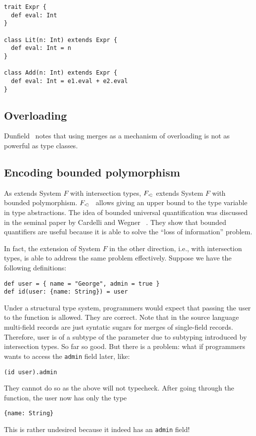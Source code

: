 
\begin{verbatim}
trait Expr {
  def eval: Int
}

class Lit(n: Int) extends Expr {
  def eval: Int = n
}

class Add(n: Int) extends Expr {
  def eval: Int = e1.eval + e2.eval
}
\end{verbatim}

\subsection{Overloading}

Dunfield~\cite{dunfield2014elaborating} notes that using merges as a mechanism
of overloading is not as powerful as type classes.

\subsection{Encoding bounded polymorphism}

As \name extends System $ F $ with intersection types, $ F_{<\!:} $ extends
System $ F $ with bounded polymorphism. $ F_{<\!:} $~\cite{pierce2002types}
allows giving an upper bound to the type variable in type abstractions. The idea
of bounded universal quantification was discussed in the seminal paper by
Cardelli and Wegner ~\cite{cardelli1985understanding}. They show that bounded
quantifiers are useful because it is able to solve the ``loss of information''
problem.

In fact, the extension of System $ F $ in the other direction, i.e., with
intersection types, is able to address the same problem effectively. Suppose we
have the following definitions:
\begin{verbatim}
def user = { name = "George", admin = true }
def id(user: {name: String}) = user
\end{verbatim}
Under a structural type system, programmers would expect that passing the user
to the function is allowed. They are correct. Note that in the source language
multi-field records are just syntatic sugars for merges of single-field records.
Therefore, user is of a subtype of the parameter due to subtyping introduced by
intersection types. So far so good. But there is a problem: what if programmers
wants to access the \texttt{admin} field later, like:
\begin{verbatim}
(id user).admin
\end{verbatim}
They cannot do so as the above will not typecheck. After going through the
function, the user now has only the type
\begin{verbatim}
{name: String}
\end{verbatim}
This is rather undesired because it indeed has an \texttt{admin} field!

